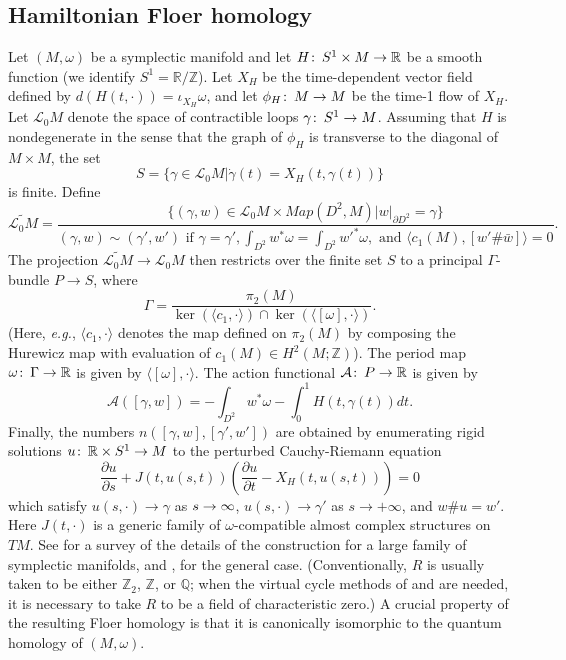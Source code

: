 \documentclass{amsart}
\theoremstyle{plain}
\theoremstyle{definition}
\theoremstyle{remark}
\def\co{\colon\thinspace}
\begin{document}
\subsection{Hamiltonian Floer homology} Let $(M,\omega)$ be a symplectic manifold and let $H\co S^1\times M\to\mathbb{R}$ be a smooth function (we identify $S^1=\mathbb{R}/\mathbb{Z}$).  Let $X_H$ be the time-dependent vector field defined by $d(H(t,\cdot))=\iota_{X_H}\omega$, and let $\phi_H\co M\to M$ be the time-1 flow of $X_H$.  Let $\mathcal{L}_0M$ denote the space of contractible  loops $\gamma\co S^1\to M$.  Assuming that $H$ is nondegenerate in the sense that the  graph of $\phi_H$ is transverse to the diagonal of $M\times M$, the set \[ S=\{\gamma\in \mathcal{L}_0M| \dot{\gamma}(t)=X_H(t,\gamma(t))\}\] is finite.  Define \[ \widetilde{\mathcal{L}_0M}=\frac{\{(\gamma,w)\in \mathcal{L}_0M\times Map(D^2,M)| w|_{\partial D^2}=\gamma\}}{(\gamma,w)\sim (\gamma',w') \mbox{ if }\gamma=\gamma', \int_{D^2}w^*\omega=\int_{D^2}w'^*\omega,\mbox{ and }\langle c_1(M),[w'\#\bar{w}]\rangle=0}.\]   
The projection $\widetilde{\mathcal{L}_0M}\to\mathcal{L}_0M$ then restricts over the finite set $S$ to a principal $\Gamma$-bundle $P\to S$, where \[ \Gamma=\frac{\pi_2(M)}{\ker(\langle c_1,\cdot\rangle)\cap \ker(\langle [\omega],\cdot\rangle)}.\]  (Here, \emph{e.g.}, $\langle c_1,\cdot\rangle$ denotes the map defined on $\pi_2(M)$ by composing the Hurewicz map with evaluation of $c_1(M)\in H^2(M;\mathbb{Z})$).  The period map $\omega\co\Gamma\to\mathbb{R}$ is given by $\langle [\omega],\cdot\rangle$.  The action functional $\mathcal{A}\co P\to \mathbb{R}$ is given by \[ \mathcal{A}([\gamma,w])=-\int_{D^2}w^*\omega-\int_{0}^{1}H(t,\gamma(t))dt.\]    Finally, the numbers $n([\gamma,w],[\gamma',w'])$ are obtained by enumerating rigid solutions $u\co \mathbb{R}\times S^1\to M$ to the perturbed Cauchy-Riemann equation \[ \frac{\partial u}{\partial s}+J(t,u(s,t))\left(\frac{\partial u}{\partial t}-X_H(t,u(s,t))\right)=0\] which satisfy $u(s,\cdot)\to\gamma$ as $s\to\-\infty$, $u(s,\cdot)\to\gamma'$ as $s\to +\infty$, and $w\#u=w'$.  Here $J(t,\cdot)$ is a generic family of $\omega$-compatible almost complex structures on $TM$.  See \cite{Sal} for a survey of the details of the construction for a large family of symplectic manifolds, and \cite{FO},\cite{LT} for the general case.  (Conventionally, $R$ is usually taken to be either $\mathbb{Z}_2$, $\mathbb{Z}$, or $\mathbb{Q}$;  when the virtual cycle methods of \cite{FO} and \cite{LT} are needed, it is necessary to take  $R$ to be a field of characteristic zero.) 
A crucial property of the resulting Floer homology is that it is canonically isomorphic to the quantum homology of $(M,\omega)$.  
\end{document}
